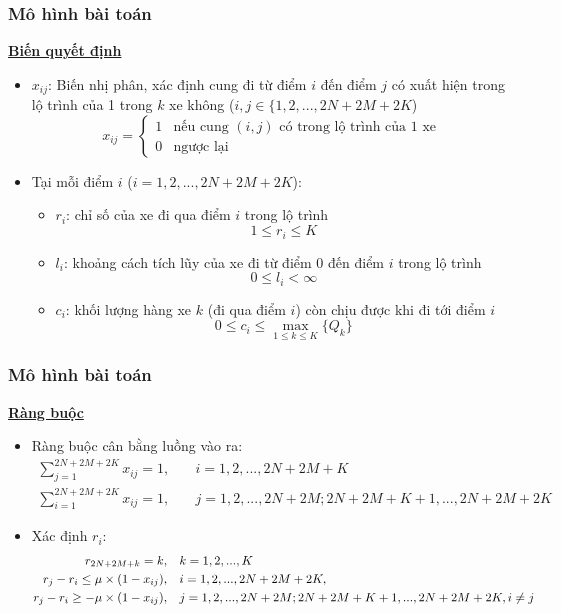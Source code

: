 \documentclass{beamer}
\begin{document}
	\begin{frame}
	\frametitle{Mô hình bài toán}
	\textbf{\underline{Biến quyết định}}
	\begin{itemize}
		\item $x_{ij}$: Biến nhị phân, xác định cung đi từ điểm $i$ đến điểm $j$ có xuất hiện trong lộ trình của 1 trong $k$ xe không ($i,j\in \{1,2,...,2N+2M+2K$)
		\begin{equation}
		x_{ij} = 
		\begin{cases}
		1 & \text{nếu cung $(i,j)$ có trong lộ trình của 1 xe}\\
		0 & \text{ngược lại}
		\end{cases}
		\end{equation}
		\item Tại mỗi điểm $i$ ($i=1,2,...,2N+2M+2K$):
		\begin{itemize}
			\item $r_i$: chỉ số của xe đi qua điểm $i$ trong lộ trình
			\begin{equation}
			1\leq r_i\leq K
			\end{equation}
			\item $l_i$: khoảng cách tích lũy của xe đi từ điểm $0$ đến điểm $i$ trong lộ trình
			\begin{equation}
			0\leq l_i < \infty
			\end{equation}
			\item $c_i$: khối lượng hàng xe $k$ (đi qua điểm $i$) còn chịu được khi đi tới điểm $i$
			\begin{equation}
			0\leq c_i\leq \max _{1\leq k\leq K} \{Q_k\}
			\end{equation}
		\end{itemize}
	\end{itemize}
	
\end{frame}
\begin{frame}
\frametitle{Mô hình bài toán}
\textbf{\underline{Ràng buộc}}
\begin{itemize}
\item Ràng buộc cân bằng luồng vào ra:
\begin{align}
\sum_{j=1}^{2N+2M+2K} x_{ij} = 1,\quad & i=1,2,...,2N+2M+K \\
\sum_{i=1}^{2N+2M+2K} x_{ij} = 1,\quad & j=1,2,...,2N+2M;2N+2M+K+1,...,2N+2M+2K
\end{align}
\item Xác định $r_i$:
\begin{align}
r_{2N+2M+k} = k,\quad & k=1,2,...,K \\
r_j - r_i\leq \mu\times (1 - x_{ij}),\quad & i=1,2,...,2N+2M+2K, \\
r_j - r_i\geq -\mu\times (1 -x_{ij}),\quad & j=1,2,...,2N+2M;2N+2M+K+1,...,2N+2M+2K, i\ne j \notag
\end{align}
\end{itemize}
\end{frame}
\end{document}
